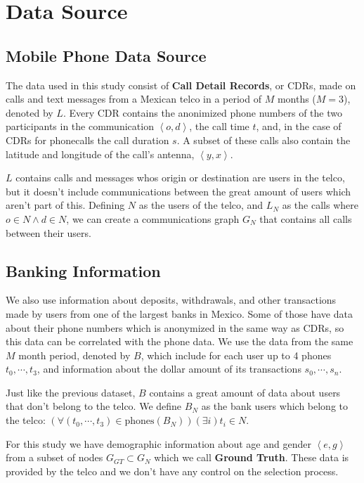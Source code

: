 \section{Data Source}

\subsection{Mobile Phone Data Source}


The data used in this study consist of \textbf{Call Detail Records}, or CDRs, made on calls and text messages from a Mexican telco in a period of \( M \) months (\( M = 3 \)), denoted by \( L \). Every CDR contains the anonimized phone numbers of the two participants in the communication \(\left<o, d\right>\), the call time \( t \), and, in the case of CDRs for phonecalls the call duration \( s \). A subset of these calls also contain the latitude and longitude of the call's antenna, \( \left<y, x\right> \).

\( L \) contains calls and messages whos origin or destination are users in the telco, but it doesn't include communications between the great amount of users which aren't part of this. Defining \( N \) as the users of the telco, and \( L_N \) as the calls where \( o \in N \wedge d \in N \), we can create a communications graph \( G_N \) that contains all calls between their users.

\subsection{Banking Information}

We also use information about deposits, withdrawals, and other transactions made by users from one of the largest banks in Mexico. Some of those have data about their phone numbers which is anonymized in the same way as CDRs, so this data can be correlated with the phone data. We use the data from the same \( M \) month period, denoted by \( B \), which include for each user up to 4 phones \( t_0, \cdots, t_3 \), and information about the dollar amount of its transactions \( s_0, \cdots, s_n \).

Just like the previous dataset, \( B \) contains a great amount of data about users that don't belong to the telco. We define \( B_N \) as the bank users which belong to the telco: \( \left( \forall \left( t_0, \cdots, t_3 \right) \in \text{phones}\left( B_N \right) \right) \left( \exists i \right) t_i \in N \).

For this study we have demographic information about age and gender \( \left< e, g \right> \) from a subset of nodes \( G_{GT} \subset G_N \) which we call \textbf{Ground Truth}. These data is provided by the telco and we don't have any control on the selection process.

